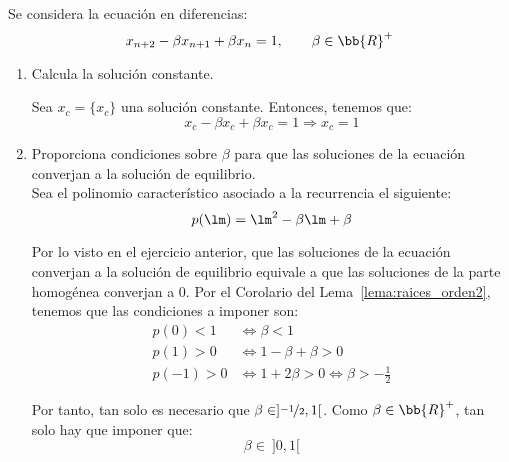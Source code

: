 \begin{ejercicio}
    Se considera la ecuación en diferencias:
    \begin{equation*}
        x_{n+2} - \beta x_{n+1} + \beta x_n = 1, \qquad \beta\in \bb{R}^+
    \end{equation*}
    \begin{enumerate}
        \item Calcula la solución constante.

        Sea $x_c=\{x_c\}$ una solución constante. Entonces, tenemos que:
        \begin{equation*}
            x_c - \beta x_c + \beta x_c = 1 \Longrightarrow x_c=1
        \end{equation*}
        
        \item Proporciona condiciones sobre $\beta$ para que las soluciones de la ecuación converjan a la solución de equilibrio.\\

        Sea el polinomio característico asociado a la recurrencia el siguiente:
        \begin{equation*}
            p(\lm) = \lm^2-\beta\lm + \beta
        \end{equation*}

        Por lo visto en el ejercicio anterior, que las soluciones de la ecuación converjan a la solución de equilibrio equivale a que las soluciones de la parte homogénea converjan a $0$.
        Por el Corolario del Lema~\ref{lema:raices_orden2}, tenemos que las condiciones a imponer son:
        \begin{align*}
            p(0)<1 &\Longleftrightarrow  \beta < 1\\
            p(1)>0 &\Longleftrightarrow 1-\beta + \beta > 0\\
            p(-1)>0 &\Longleftrightarrow 1+2\beta > 0 \Longleftrightarrow \beta > -\frac{1}{2}
        \end{align*}

        Por tanto, tan solo es necesario que $\beta\in ]\nicefrac{-1}{2},1[$. Como $\beta\in \bb{R}^+$, tan solo hay que imponer que:
        \begin{equation*}
            \beta \in~]0,1[
        \end{equation*}
    \end{enumerate}
\end{ejercicio}

